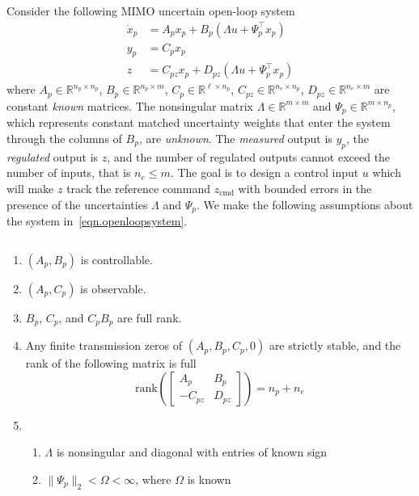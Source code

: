 \documentclass[]{../sty/aiaa-tc}
\begin{document}
  Consider the following MIMO uncertain open-loop system
  \begin{equation}
    \label{eqn.openloopsystem}
    \begin{split}
      \dot{x}_{p}&=A_{p}x_{p}+B_{p}(\Lambda u+\Psi_{p}^{\top}x_{p}) \\
      y_{p}&=C_{p}x_{p} \\
      z&=C_{pz}x_{p}+D_{pz}(\Lambda u+\Psi_{p}^{\top}x_{p})
    \end{split}
  \end{equation}
  where $A_{p}\in\mathbb{R}^{n_{p}\times n_{p}}$, $B_{p}\in\mathbb{R}^{n_{p}\times m}$, $C_{p}\in\mathbb{R}^{\ell\times n_{p}}$, $C_{pz}\in\mathbb{R}^{n_{e}\times n_{p}}$, $D_{pz}\in\mathbb{R}^{n_{e}\times m}$ are constant \textit{known} matrices.
  The nonsingular matrix $\Lambda\in\mathbb{R}^{m\times m}$ and $\Psi_{p}\in\mathbb{R}^{m\times n_{p}}$, which represents constant matched uncertainty weights that enter the system through the columns of $B_{p}$, are \textit{unknown}.
  The \textit{measured} output is $y_{p}$, the \textit{regulated} output is $z$, and the number of regulated outputs cannot exceed the number of inputs, that is $n_{e}\leq m$.
  The goal is to design a control input $u$ which will make $z$ track the reference command $z_{\text{cmd}}$ with bounded errors in the presence of the uncertainties $\Lambda$ and $\Psi_{p}$.
  We make the following assumptions about the system in\ \eqref{eqn.openloopsystem}.

  \begin{ass-dan} $\;$\label{ass.plant}
    \begin{enumerate}[\Alph{enumi}), ref=\Alph{enumi}] %
      \itemsep0em
      \item{$(A_{p},B_{p})$ is controllable.\label{ass.p.cont}}
      \item{$(A_{p},C_{p})$ is observable.\label{ass.p.obsv}}
      \item{$B_{p}$, $C_{p}$, and $C_{p}B_{p}$ are full rank.\label{ass.p.rank}}
      \item{Any finite transmission zeros of $(A_{p},B_{p},C_{p},0)$ are strictly stable, and the rank of the following matrix is full\label{ass.p.tzero}}
      \begin{equation*}
        \text{rank}\left(
        \begin{bmatrix}
          A_{p} & B_{p} \\
          -C_{pz} & D_{pz}
        \end{bmatrix}\right)
        =n_{p}+n_{e}
      \end{equation*}
      \item{%
        \begin{enumerate}[(\alph{enumii}), ref=\alph{enumii}]
          \item{$\Lambda$ is nonsingular and diagonal with entries of known sign\label{ass.p.unc.lambda}}
          \item{$\|\Psi_{p}\|_{2}<\Omega<\infty$, where $\Omega$ is known\label{ass.p.unc.wp}}
        \end{enumerate}\label{ass.p.unc}
      }
    \end{enumerate}
  \end{ass-dan}
\end{document}
